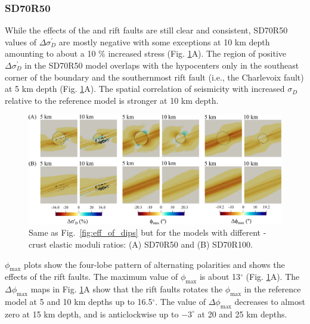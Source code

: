 \documentclass[draft]{agujournal2018}
\begin{document}
\subsubsection{SD70R50}
While the effects of the  and rift faults are still clear and consistent, SD70R50 values of $\Delta \sigma_{D}^{\prime}$ are mostly negative with some exceptions at 10 km depth amounting to about a 10 \% increased stress (Fig. \ref{fig:eff_of_moduli_ratio}A). The region of positive $\Delta\sigma_{D}^{\prime}$ in the SD70R50 model overlaps with the hypocenters only in the southeast corner of the  boundary and the southernmost rift fault (i.e., the Charlevoix fault) at 5 km depth  (Fig. \ref{fig:eff_of_moduli_ratio}A). The spatial correlation of seismicity with increased $\sigma_{D}$ relative to the reference model is stronger at 10 km depth.

\begin{figure}[ht]
\centering
\includegraphics[width=30pc]{Figures/SD70R50_100_2.png}
\caption{Same as Fig.~\ref{fig:eff_of_dips} but for the models with different -crust elastic moduli ratios: (A) SD70R50 and (B) SD70R100.}
\label{fig:eff_of_moduli_ratio}
\end{figure}

$\phi_{\max}$ plots show the four-lobe pattern of alternating polarities and shows the effects of the rift faults. The maximum value of $\phi_{\max}$ is about 13$^\circ$ (Fig. \ref{fig:eff_of_moduli_ratio}A). The $\Delta\phi_{\max}$ maps in Fig. \ref{fig:eff_of_moduli_ratio}A show that the rift faults rotates the $\phi_{\max}$ in the reference model at 5 and 10 km depths up to 16.5$^{\circ}$. The value of $\Delta\phi_{\max}$ decreases to almost zero at 15 km depth, and is anticlockwise up to $-3^{\circ}$ at 20 and 25 km depths.
\end{document}
